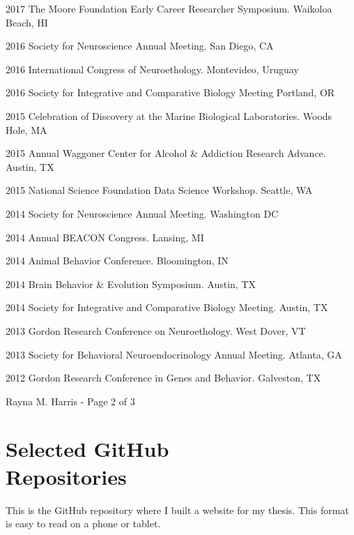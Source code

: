 \documentclass[margin,line]{CV}
\begin{document}
\begin{resume}
\begin{list1}
\item[]2017	The Moore Foundation Early Career Researcher Symposium. Waikoloa Beach, HI
\item[]2016	Society for Neuroscience Annual Meeting. San Diego, CA
\item[]2016	International Congress of Neuroethology. Montevideo, Uruguay
\item[]2016 Society for Integrative and Comparative Biology Meeting Portland, OR
\item[]2015	Celebration of Discovery at the Marine Biological Laboratories. Woods Hole, MA
\item[]2015	Annual Waggoner Center for Alcohol \& Addiction Research Advance. Austin, TX
\item[]2015	National Science Foundation Data Science Workshop. Seattle, WA
\item[]2014	Society for Neuroscience Annual Meeting. Washington DC
\item[]2014	Annual BEACON Congress. Lansing, MI
\item[]2014	Animal Behavior Conference. Bloomington, IN
\item[]2014	Brain Behavior \& Evolution Symposium. Austin, TX
\item[]2014	Society for Integrative and Comparative Biology Meeting. Austin, TX
\item[]2013	Gordon Research Conference on Neuroethology. West Dover, VT
\item[]2013	Society for Behavioral Neuroendocrinology Annual Meeting. Atlanta, GA
\item[]2012	Gordon Research Conference in Genes and Behavior. Galveston, TX
\end{list1}


\vspace{0.5 cm}
{\centerline {Rayna M. Harris - Page 2 of 3}}
\newpage



\section{\mysidestyle Selected GitHub \\Repositories}

\begin{description}
\setlength{\itemsep}{3pt}

\item [\href{https://github.com/raynamharris/Thesis}{Thesis}] This is the GitHub repository where I built a website for my thesis. This format is easy to read on a phone or tablet.


\end{description}
\end{resume}
\end{document}
